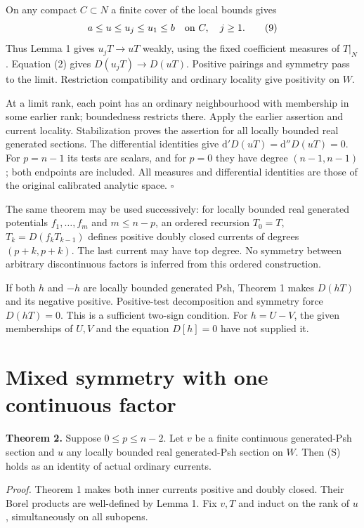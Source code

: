 \documentclass[
  11pt,
]{article}
\begin{document}
On any compact \(C\subset N\) a finite cover of the local bounds gives
\[a\leq u\leq u_j\leq u_1\leq b\quad\hbox{on }C,\quad j\geq1. \tag{9}\]
Thus Lemma 1 gives \(u_jT\to uT\) weakly, using the fixed coefficient
measures of \(T|_N\). Equation (2) gives \(D(u_jT)\to D(uT)\). Positive
pairings and symmetry pass to the limit. Restriction compatibility and
ordinary locality give positivity on \(W\).

At a limit rank, each point has an ordinary neighbourhood with
membership in some earlier rank; boundedness restricts there. Apply the
earlier assertion and current locality. Stabilization proves the
assertion for all locally bounded real generated sections. The
differential identities give \(\mathrm d'D(uT)=\mathrm d''D(uT)=0\). For
\(p=n-1\) its tests are scalars, and for \(p=0\) they have degree
\((n-1,n-1)\); both endpoints are included. All measures and
differential identities are those of the original calibrated analytic
space. \(\square\)

The same theorem may be used successively: for locally bounded real
generated potentials \(f_1,\ldots,f_m\) and \(m\leq n-p\), an ordered
recursion \(T_0=T\), \(T_k=D(f_kT_{k-1})\) defines positive doubly
closed currents of degrees \((p+k,p+k)\). The last current may have top
degree. No symmetry between arbitrary discontinuous factors is inferred
from this ordered construction.

If both \(h\) and \(-h\) are locally bounded generated Psh, Theorem 1
makes \(D(hT)\) and its negative positive. Positive-test decomposition
and symmetry force \(D(hT)=0\). This is a sufficient two-sign condition.
For \(h=U-V\), the given memberships of \(U,V\) and the equation
\(D[h]=0\) have not supplied it.

\section{Mixed symmetry with one continuous
factor}\label{mixed-symmetry-with-one-continuous-factor}

\textbf{Theorem 2.} Suppose \(0\leq p\leq n-2\). Let \(v\) be a finite
continuous generated-Psh section and \(u\) any locally bounded real
generated-Psh section on \(W\). Then (S) holds as an identity of actual
ordinary currents.

\emph{Proof.} Theorem 1 makes both inner currents positive and doubly
closed. Their Borel products are well-defined by Lemma 1. Fix \(v,T\)
and induct on the rank of \(u\), simultaneously on all subopens.
\end{document}
